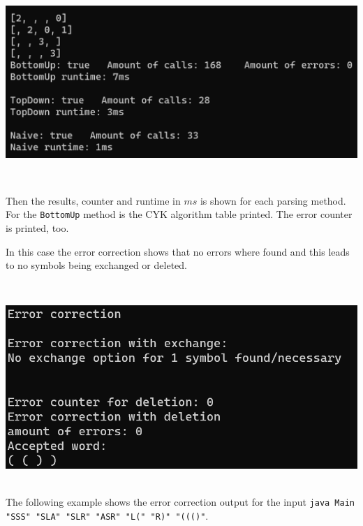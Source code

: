 \documentclass[a4paper, 11pt]{article}
\newcommand{\dq}{"}
\begin{document}
\begin{minipage}{0.6\textwidth}
\includegraphics[scale=0.6]{images/terminal_2.png}
\end{minipage}\begin{minipage}{0.1\textwidth}
\ 
\end{minipage}\begin{minipage}{0.3\textwidth}
Then the results, counter and runtime in $ms$ is shown for each parsing method. \\
For the \texttt{BottomUp} method is the CYK algorithm table printed.
The error counter is printed, too.
\end{minipage}

\begin{minipage}{0.35\textwidth}
In this case the error correction shows that no errors where found and this leads to no symbols being exchanged or deleted.

\end{minipage}\begin{minipage}{0.1\textwidth}
\ 
\end{minipage}\begin{minipage}{0.55\textwidth}
\includegraphics[scale=0.7]{images/terminal_3.png}
\end{minipage}

\ \\
The following example shows the error correction output for the input \texttt{java Main \dq SSS\dq \ \dq SLA\dq \ \dq SLR\dq \ \dq ASR\dq \ \dq L(\dq \ \dq R)\dq\  \dq ((()\dq}. \\
\end{document}
